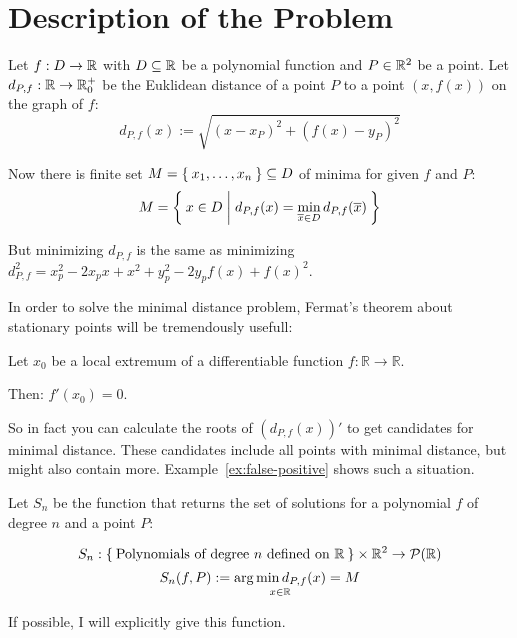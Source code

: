 \chapter{Description of the Problem}
Let $f: D \rightarrow \mathbb{R}$ with $D \subseteq \mathbb{R}$ be a polynomial function and $P \in \mathbb{R}^2$
be a point. Let $d_{P,f}: \mathbb{R} \rightarrow \mathbb{R}_0^+$
be the Euklidean distance of a point $P$ to a point $\left (x, f(x) \right )$
on the graph of $f$:
\[d_{P,f} (x) := \sqrt{(x - x_P)^2 + (f(x) - y_P)^2}\]

Now there is finite set $M = \Set{x_1, \dots, x_n} \subseteq D$ of minima for given $f$ and $P$:
\[M = \Set{x \in D | d_{P,f}(x) = \min_{\overline{x} \in D} d_{P,f}(\overline{x})}\] 

But minimizing $d_{P,f}$ is the same as minimizing 
$d_{P,f}^2 = x_p^2 - 2x_p x + x^2 + y_p^2 - 2y_p f(x) + f(x)^2$.

In order to solve the minimal distance problem, Fermat's theorem
about stationary points will be tremendously usefull:

\begin{theorem}\label{thm:fermats-theorem}
    Let $x_0$ be a local extremum of a differentiable function $f: \mathbb{R} \rightarrow \mathbb{R}$.

    Then: $f'(x_0) = 0$.
\end{theorem}

So in fact you can calculate the roots of $(d_{P,f}(x))'$ to get
candidates for minimal distance. These candidates include all points
with minimal distance, but might also contain more. Example~\ref{ex:false-positive}
shows such a situation.

Let $S_n$ be the function that returns the set of solutions for a
polynomial $f$ of degree $n$ and a point $P$:

\[S_n: \Set{\text{Polynomials of degree } n \text{ defined on } \ensuremath{\mathbb{R}}} \times \mathbb{R}^2 \rightarrow \mathcal{P}({\mathbb{R}})\]
\[S_n(f, P) := \underset{x\in\mathbb{R}}{\arg \min d_{P,f}(x)} = M\]

If possible, I will explicitly give this function.
